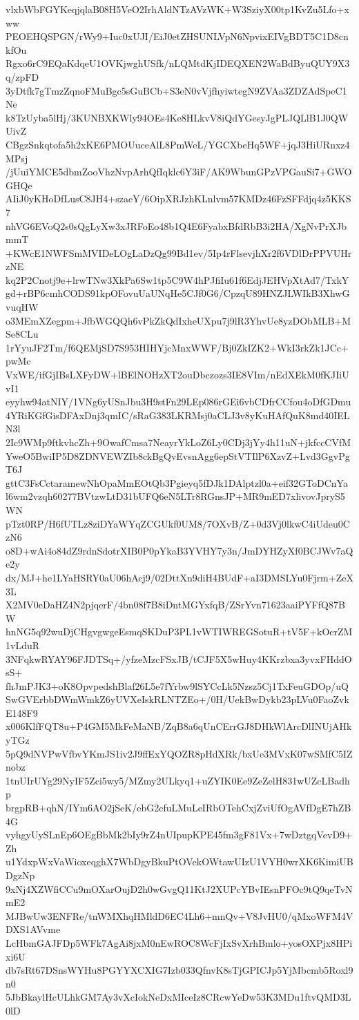 vlxbWbFGYKeqjqlaB08H5VeO2IrhAldNTzAVzWK+W3SziyX00tp1KvZu5Lfo+xww
PEOEHQSPGN/rWy9+Iuc0xUJI/EiJ0etZHSUNLVpN6NpvixEIVgBDT5C1D8cnkfOu
Rgxo6rC9EQaKdqeU1OVKjwghUSfk/nLQMtdKjIDEQXEN2WaBdByuQUY9X3q/zpFD
3yDtfk7gTmzZqnoFMuBgc5sGuBCb+S3eN0vVjfhyiwtegN9ZVAa3ZDZAdSpeC1Ne
k8TzUyba5lHj/3KUNBXKWly94OEs4Ke8HLkvV8iQdYGesyJgPLJQLlB1J0QWUivZ
CBgzSnkqtofa5h2xKE6PMOUuceAlL8PmWeL/YGCXbeHq5WF+jqJ3HiURnxz4MPsj
/jUuiYMCE5dbmZooVhzNvpArhQfIqklc6Y3iF/AK9WbunGPzVPGauSi7+GWOGHQe
AIiJ0yKHoDfLusC8JH4+szaeY/6OipXRJzhKLnlvm57KMDz46FzSFFdjq4z5KKS7
nhVG6EVoQ2s0sQgLyXw3xJRFoEo48b1Q4E6FyabxBfdRbB3i2HA/XgNvPrXJbmmT
+KWcE1NWFSmMVIDeLOgLaDzQg99Bd1ev/5Ip4rFlsevjhXr2f6VDlDrPPVUHrzNE
kq2P2Cnotj9e+lrwTNw3XkPa6Sw1tp5C9W4hPJfiIu61f6EdjJEHVpXtAd7/TxkY
gd+rBP6cmhCODS91kpOFovuUaUNqHe5CJf0G6/CpzqU89HNZJLWIkB3XhwGvuqHW
o3MEmXZegpm+JfbWGQQh6vPkZkQdIxheUXpu7j9lR3YhvUe8yzDObMLB+MSe8CLu
1rYyuJF2Tm/f6QEMjSD7S953HIHYjcMnxWWF/Bj0ZkIZK2+WkI3rkZk1JCc+pwMc
VxWE/ifGjIBsLXFyDW+lBElNOHzXT2ouDbczozs3IE8VIm/nEdXEkM0fKJIiUvI1
eyyhw94atNIY/1VNg6yUSnJbu3H9stFn29LEp086rGEi6vbCDfrCCfou4oDfGDmu
4YRiKGfGisDFAxDnj3qmIC/sRaG383LKRMsj0aCLJ3v8yKuHAfQuK8md40IELN3l
2Ic9WMp9ftkvhcZh+9OwafCmsa7NeayrYkLoZ6Ly0CDj3jYy4h11uN+jkfccCVfM
YweO5BwiIP5D8ZDNVEWZIb8ckBgQvEvsnAgg6epStVTIlP6XzvZ+Lvd3GgvPgT6J
gttC3FsCctaramewNhOpaMmEOtQb3Pgieyq5fDJk1DAlptzl0a+eif32GToDCnYa
l6wm2vzqh60277BVtzwLtD31bUFQ6eN5LTr8RGnsJP+MR9mED7xlivovJpryS5WN
pTzt0RP/H6fUTLz8ziDYaWYqZCGUkf0UM8/7OXvB/Z+0d3Vj0lkwC4iUdeu0CzN6
o8D+wAi4o84dZ9rdnSdotrXIB0P0pYkaB3YVHY7y3n/JmDYHZyXf0BCJWv7aQe2y
dx/MJ+he1LYaHSRY0aU06hAcj9/02DttXn9diH4BUdF+aI3DMSLYu0Fjrm+ZeX3L
X2MV0eDaHZ4N2pjqerF/4bn08f7B8iDntMGYxfqB/ZSrYvn71623aaiPYFfQ87BW
hnNG5q92wuDjCHgvgwgeEsmqSKDuP3PL1vWTIWREGSotuR+tV5F+kOcrZM1vLduR
3NFqkwRYAY96FJDTSq+/yfzeMzcFSxJB/tCJF5X5wHuy4KKrzbxa3yvxFHddOsS+
fhJmPJK3+oK8OpvpedshBlaf26L5e7fYrbw9lSYCcLk5Nzsz5Cj1TxFeuGDOp/uQ
SwGVErbbDWmWmkZ6yUVXeIskRLNTZEo+/0H/UekBwDykb23pLVu0FaoZvkE148F9
x006KlfFQT8u+P4GM5MkFeMaNB/ZqB8a6qUnCErrGJ8DHkWlArcDlINUjAHkyTGz
5pQ9dNVPwVfbvYKmJS1iv2J9ffExYQOZR8pHdXRk/bxUe3MVxK07wSMfC5IZnobz
1tnUIrUYg29NyIF5Zci5wy5/MZmy2ULkyq1+uZYIK0Ee9ZeZelH831wUZcLBadhp
brgpRB+qhN/IYm6AO2jSeK/ebG2cfuLMuLeIRbOTehCxjZviUfOgAVfDgE7hZB4G
vyhgyUySLnEp6OEgBbMk2bIy9rZ4nUIpupKPE45fm3gF81Vx+7wDztgqVevD9+Zh
u1YdxpWxVaWioxeqghX7WbDgyBkuPtOVekOWtawUIzU1VYH0wrXK6KimiUBDgzNp
9xNj4XZWfiCCu9mOXarOujD2h0wGvgQ11KtJ2XUPcYBvIEsnPFOc9tQ9qeTvNmE2
MJBwUw3ENFRe/tnWMXhqHMldD6EC4Lh6+mnQv+V8JvHU0/qMxoWFM4VDXS1AVvme
LcHbmGAJFDp5WFk7AgAi8jxM0nEwROC8WcFjIxSvXrhBmlo+yosOXPjx8HPixi6U
db7sRt67DSnsWYHu8PGYYXCXIG7Izb033QfnvK8sTjGPICJp5YjMbcmb5Roxl9n0
5JbBkaylHcULhkGM7Ay3vXcIokNeDxMIceIz8CRcwYeDw53K3MDu1ftvQMD3L0lD
